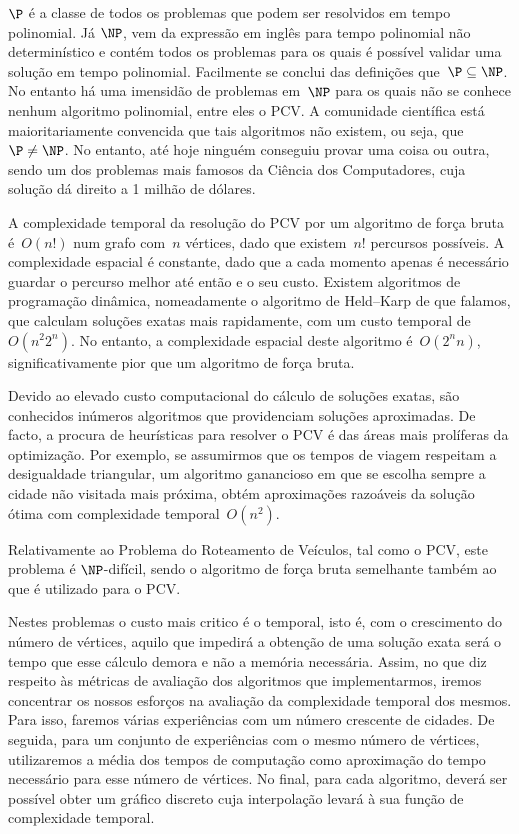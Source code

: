 \documentclass[12pt,a4paper,reqno]{report}
\numberwithin{figure}{section}
\numberwithin{equation}{section}
\numberwithin{figure}{section}
\numberwithin{equation}{section}
\begin{document}
$\P$ é a classe de todos os problemas que podem ser resolvidos em tempo polinomial. Já $\NP$, vem da expressão em inglês para tempo polinomial não determinístico e contém todos os problemas para os quais é possível validar uma solução em tempo polinomial. Facilmente se conclui das definições que~$\P \subseteq \NP$. No entanto há uma imensidão de problemas em~$\NP$ para os quais não se conhece nenhum algoritmo polinomial, entre eles o PCV. A comunidade científica está maioritariamente convencida que tais algoritmos não existem, ou seja, que~$\P \neq \NP$. No entanto, até hoje ninguém conseguiu provar uma coisa ou outra, sendo um dos problemas mais famosos da Ciência dos Computadores, cuja solução dá direito a 1 milhão de dólares.

A complexidade temporal da resolução do PCV por um algoritmo de força bruta é~$O(n!)$ num grafo com~$n$ vértices, dado que existem~$n!$ percursos possíveis. A complexidade espacial é constante, dado que a cada momento apenas é necessário guardar o percurso melhor até então e o seu custo. Existem algoritmos de programação dinâmica, nomeadamente o algoritmo de Held–Karp de que falamos, que calculam soluções exatas mais rapidamente, com um custo temporal de~$O(n^2 2^n)$. No entanto, a complexidade espacial deste algoritmo é~$O(2^n n)$, significativamente pior que um algoritmo de força bruta.

Devido ao elevado custo computacional do cálculo de soluções exatas, são conhecidos inúmeros algoritmos que providenciam soluções aproximadas. De facto, a procura de heurísticas para resolver o PCV é das áreas mais prolíferas da optimização. Por exemplo, se assumirmos que os tempos de viagem respeitam a desigualdade triangular, um algoritmo ganancioso em que se escolha sempre a cidade não visitada mais próxima, obtém aproximações razoáveis da solução ótima com complexidade temporal~$O(n^2)$.

Relativamente ao Problema do Roteamento de Veículos, tal como o PCV, este problema é $\NP$-difícil, sendo o algoritmo de força bruta semelhante também ao que é utilizado para o PCV.

Nestes problemas o custo mais critico é o temporal, isto é, com o crescimento do número de vértices, aquilo que impedirá a obtenção de uma solução exata será o tempo que esse cálculo demora e não a memória necessária. Assim, no que diz respeito às métricas de avaliação dos algoritmos que implementarmos, iremos concentrar os nossos esforços na avaliação da complexidade temporal dos mesmos. Para isso, faremos várias experiências com um número crescente de cidades. De seguida, para um conjunto de experiências com o mesmo número de vértices, utilizaremos a média dos tempos de computação como aproximação do tempo necessário para esse número de vértices. No final, para cada algoritmo, deverá ser possível obter um gráfico discreto cuja interpolação levará à sua função de complexidade temporal.
\end{document}
